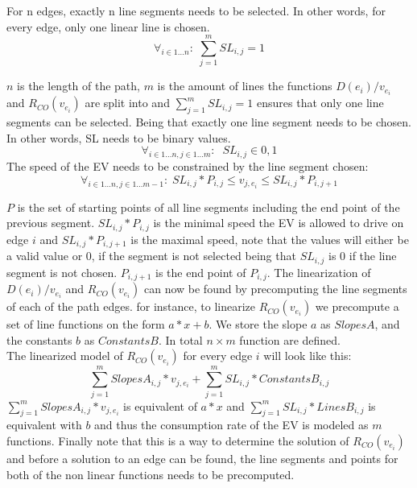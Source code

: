 For n edges, exactly n line segments needs to be selected. In other words, for every edge, only one linear line is chosen. 
\begin{equation*}
\forall_{i\in1 \dots n }:\; \sum_{j=1}^{m} SL_{i,j} = 1
\end{equation*}

$n$ is the length of the path, $m$ is the amount of lines the functions \( D(e_i)/v_{e_i} \) and $R_{CO}(v_{e_i})$ are split into and $\sum_{j=1}^{m} SL_{i,j} = 1$ ensures that only one line segments can be selected.
Being that exactly one line segment needs to be chosen. In other words, SL needs to be binary values.
\begin{equation*}
\forall_{i\in1 \dots n, j \in 1 \dots m}: \; \; SL_{i,j} \in{0,1} 
\end{equation*}
The speed of the EV needs to be constrained by the line segment chosen:
\begin{equation*}
\forall_{i\in1 \dots n, j \in 1 \dots m-1}:\; SL_{i,j} * P_{i,j}  \le  v_{j,e_i} \le SL_{i,j}*P_{i,j+1}
\end{equation*}

$P$ is the set of starting points of all line segments including the end point of the previous segment. $SL_{i,j} * P_{i,j}$ is the minimal speed the EV is allowed to drive on edge $i$ and $SL_{i,j}*P_{i,j+1}$ is the maximal speed, note that the values will either be a valid value or $0$, if the segment is not selected being that $SL_{i,j}$ is $0$ if the line segment is not chosen. $P_{i,j+1}$ is the end point of $P_{i,j}$. 
The linearization of \( D(e_i)/v_{e_i} \) and $R_{CO}(v_{e_i})$ can now be found by precomputing the line segments of each of the path edges. for instance, to linearize $R_{CO}(v_{e_i})$ we precompute a set of line functions on the form $a*x+b$. We store the slope $a$ as $SlopesA$, and the constants $b$ as $ConstantsB$. In total $n \times m$ function are defined. \\
The linearized model of $R_{CO}(v_{e_i})$ for every edge $i$ will look like this:
\begin{equation*}
\sum_{j=1}^{m} SlopesA_{i,j}*v_{j,e_i} + \sum_{j=1}^{m} SL_{i,j}*ConstantsB_{i,j} 
\end{equation*}
$\sum_{j=1}^{m} SlopesA_{i,j}*v_{j,e_i}$ is equivalent of $a*x$ and $\sum_{j=1}^{m} SL_{i,j}*LinesB_{i,j}$ is equivalent with $b$ and thus the consumption rate of the EV is modeled as $m$ functions. 
Finally note that this is a way to determine the solution of $R_{CO}(v_{e_i})$ and before a solution to an edge can be found, the line segments and points  for both of the non linear functions needs to be precomputed. 


